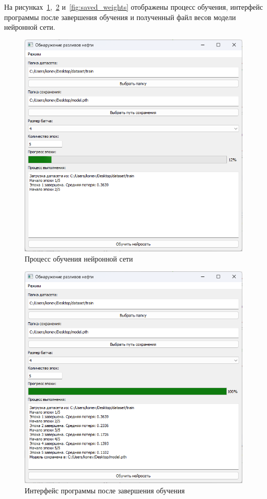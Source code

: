 На рисунках~\ref{fig:training_process},~\ref{fig:training_result} и~\ref{fig:saved_weights} отображены процесс обучения, интерфейс программы после завершения обучения и полученный файл весов модели нейронной сети.
\begin{figure}[H]
	\centering
	\includegraphics[width=0.7\linewidth]{images/обучение}
	\caption{Процесс обучения нейронной сети}
	\label{fig:training_process}
\end{figure}
\begin{figure}[H]
	\centering
	\includegraphics[width=0.7\linewidth]{"images/обучение результат"}
	\caption{Интерфейс программы после завершения обучения}
	\label{fig:training_result}
\end{figure}
